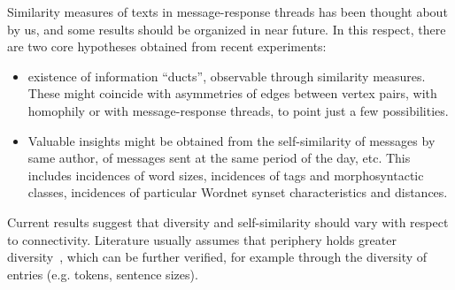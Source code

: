 Similarity measures of texts in message-response threads has been thought about by us,
and some results should be organized in near future.
In this respect, there are two core hypotheses obtained from recent experiments:
\begin{itemize}
    \item existence of information ``ducts'', observable through similarity measures.
	    These might coincide with asymmetries of edges between vertex pairs,
		with homophily or with message-response threads, to point just a few possibilities.
    \item Valuable insights might be obtained from the self-similarity of messages by same author,
	    of messages sent at the same period of the day, etc.
	    This includes incidences of word sizes, incidences of tags and morphosyntactic classes,
	    incidences of particular Wordnet synset characteristics and distances.
\end{itemize}

Current results suggest that diversity and self-similarity should vary with respect to connectivity. 
Literature usually assumes that periphery holds greater diversity~\cite{easley},
which can be further verified, for example through the diversity of entries (e.g. tokens, sentence sizes).

